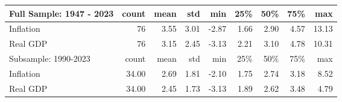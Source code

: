 \begin{tabular}{lrrrrrrrr}
\toprule
Full Sample: 1947 - 2023 & count & mean & std & min & 25\% & 50\% & 75\% & max \\
\midrule
Inflation & 76 & 3.55 & 3.01 & -2.87 & 1.66 & 2.90 & 4.57 & 13.13 \\
Real GDP & 76 & 3.15 & 2.45 & -3.13 & 2.21 & 3.10 & 4.78 & 10.31 \\
\midrule
Subsample: 1990-2023 & count & mean & std & min & 25\% & 50\% & 75\% & max \\
\midrule
Inflation & 34.00 & 2.69 & 1.81 & -2.10 & 1.75 & 2.74 & 3.18 & 8.52 \\
Real GDP & 34.00 & 2.45 & 1.73 & -3.13 & 1.89 & 2.62 & 3.48 & 4.79 \\
\bottomrule
\end{tabular}
